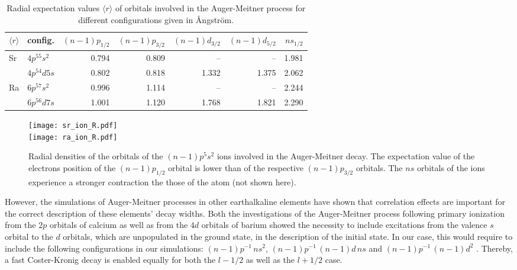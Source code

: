 \documentclass[aps,amssymb,preprint,a4paper,longbibliography]{revtex4}
\begin{document}
%
\begin{table}[h]
 \centering
 \caption{Radial expectation values $\langle r \rangle$ of
          orbitals involved in the Auger-Meitner process
          for different configurations
          given in {\AA}ngstr{\"o}m.
}
 \begin{tabular}{llrrrrr}
  \toprule
   $\langle r \rangle$ &     config. &   $(n-1)p_{1/2}$ & $(n-1)p_{3/2}$ & $(n-1)d_{3/2}$ & $(n-1)d_{5/2}$ & $ns_{1/2}$\\
  \midrule
   \multirow{2}{*}{Sr} & $4p^55s^2$ & 0.794 &     0.809    &      --        &        --      &  1.981\\
       &      $4p^54d5s$ &            0.802 &     0.818    &    1.332       &      1.375     &  2.062\\
   \multirow{2}{*}{Ra} & $6p^57s^2$ & 0.996 &     1.114    &      --        &        --      &  2.244\\
       &      $6p^56d7s$ &            1.001 &     1.120    &    1.768       &      1.821     &  2.290\\
  \bottomrule
 \end{tabular}
 \label{tab:widths}
\end{table}

\begin{figure}[h]
 \centering
 \texttt{[image: sr\_ion\_R.pdf]}\\
 \texttt{[image: ra\_ion\_R.pdf]}\\
 \caption{Radial densities of the orbitals of the $(n-1)p^5s^2$ ions
          involved in the Auger-Meitner decay.
          The expectation value of the electrons position of the $(n-1)p_{1/2}$
          orbital is lower than of the respective $(n-1)p_{3/2}$
          orbitals. The $ns$ orbitals of the ions experience a stronger
          contraction the those of the atom (not shown here).}
 \label{fig:radial_pure}
\end{figure}

However, the simulations of Auger-Meitner processes in other earthalkaline elements
have shown that correlation effects are important for the correct
description of these elements' decay widths. Both the investigations of
the Auger-Meitner process following primary ionization
from the $2p$ orbitals of calcium \cite{Nikkinen05}
as well as from the $4d$ orbitals of barium \cite{Rose80}
showed the necessity to include excitations from the valence $s$ orbital to
the $d$ orbitals, which are unpopulated in the ground state, in the
description of the initial state.
In our case, this would require to include the following configurations in our
simulations:
 $(n-1)p^{-1} \,ns^2$,
 $(n-1)p^{-1} \,(n-1)d \, ns$ and
 $(n-1)p^{-1} \,(n-1)d^2$ .    
{Thereby, a fast Coster-Kronig decay is enabled equally for both the $l-1/2$ as
well as the $l+1/2$ case.}
\end{document}

